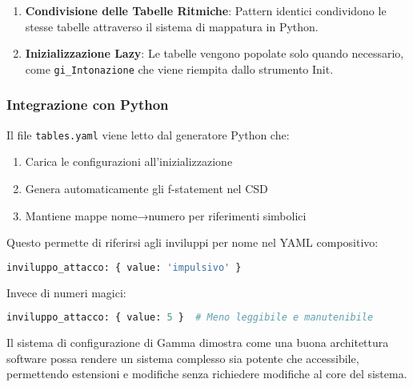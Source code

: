 \begin{enumerate}
    \item \textbf{Condivisione delle Tabelle Ritmiche}: Pattern identici condividono le stesse tabelle attraverso il sistema di mappatura in Python.
    \item \textbf{Inizializzazione Lazy}: Le tabelle vengono popolate solo quando necessario, come \texttt{gi\_Intonazione} che viene riempita dallo strumento Init.
\end{enumerate}
\subsubsection{Integrazione con Python}
Il file \texttt{tables.yaml} viene letto dal generatore Python che:
\begin{enumerate}
    \item Carica le configurazioni all'inizializzazione
    \item Genera automaticamente gli f-statement nel CSD
    \item Mantiene mappe nome→numero per riferimenti simbolici
\end{enumerate}
Questo permette di riferirsi agli inviluppi per nome nel YAML compositivo:
\begin{lstlisting}[language=Python]
inviluppo_attacco: { value: 'impulsivo' }
\end{lstlisting}

Invece di numeri magici:
\begin{lstlisting}[language=Python]
inviluppo_attacco: { value: 5 }  # Meno leggibile e manutenibile
\end{lstlisting}

Il sistema di configurazione di Gamma dimostra come una buona architettura software possa rendere un sistema complesso sia potente che accessibile, permettendo estensioni e modifiche senza richiedere modifiche al core del sistema.